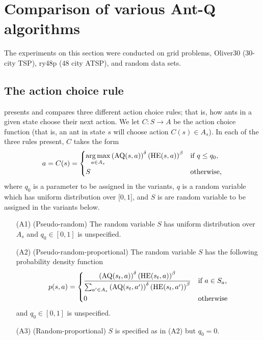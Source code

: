 \section{Comparison of various Ant-Q algorithms}

The experiments on this section were conducted on grid problems, Oliver30 (30-city TSP), ry48p (48 city ATSP), and random data sets. 

\subsection{The action choice rule}

\textcite{gambardella1995ant} presents and compares three different action choice rules; that is, how ants in a given state choose their next action. We let $C: S \to A$ be the action choice function (that is, an ant in state $s$ will choose action $C(s) \in A_s$). In each of the three rules present, $C$ takes the form
\[
    a = C(s) =
    \begin{dcases}
        \operatorname*{arg\,max}_{a \in A_{s}} \left(
        \operatorname{AQ}(s, a)
        \right)^\delta \left(
        \operatorname{HE}(s, a)
        \right)^\beta & \text{if $q \leq q_0$,} \\
        S             & \text{otherwise,}
    \end{dcases}
\]
where $q_0$ is a parameter to be assigned in the variants, $q$ is a random variable which has uniform distribution over $[0,1$], and $S$ is are random variable to be assigned in the variants below.

    \begin{enumerate}
        \item[(A1)] (Pseudo-random) The random variable $S$ has uniform distribution over $A_s$ and $q_0 \in [0,1]$ is unspecified.
        \item[(A2)] (Pseudo-random-proportional) The random variable $S$ has the following probability density function
            \[
                p(s, a) = \begin{dcases}
                    \dfrac{\left(
                        \operatorname{AQ}(s_t, a)
                        \right)^\delta \left(
                        \operatorname{HE}(s_t, a)
                        \right)^\beta}
                    {\sum_{a' \in A_s} \left(
                        \operatorname{AQ}(s_t, a')
                        \right)^\delta \left(
                        \operatorname{HE}(s_t, a')
                    \right)^\beta} & \text{if $a \in S_a$,} \\
                    0              & \text{otherwise}
                \end{dcases}
            \]
            and $q_0 \in [0,1]$ is unspecified.
        \item[(A3)] (Random-proportional) $S$ is specified as in (A2) but $q_0 = 0$.
    \end{enumerate}

